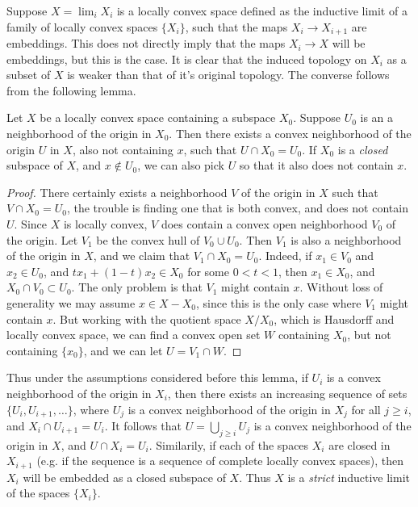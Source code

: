 Suppose $X = \lim_i X_i$ is a locally convex space defined as the inductive limit of a family of locally convex spaces $\{ X_i \}$, such that the maps $X_i \to X_{i+1}$ are embeddings. This does not directly imply that the maps $X_i \to X$ will be embeddings, but this is the case. It is clear that the induced topology on $X_i$ as a subset of $X$ is weaker than that of it's original topology. The converse follows from the following lemma.

\begin{lemma}
    Let $X$ be a locally convex space containing a subspace $X_0$. Suppose $U_0$ is an a neighborhood of the origin in $X_0$. Then there exists a convex neighborhood of the origin $U$ in $X$, also not containing $x$, such that $U \cap X_0 = U_0$. If $X_0$ is a \emph{closed} subspace of $X$, and $x \not \in U_0$, we can also pick $U$ so that it also does not contain $x$.
\end{lemma}
\begin{proof}
    There certainly exists a neighborhood $V$ of the origin in $X$ such that $V \cap X_0 = U_0$, the trouble is finding one that is both convex, and does not contain $U$. Since $X$ is locally convex, $V$ does contain a convex open neighborhood $V_0$ of the origin. Let $V_1$ be the convex hull of $V_0 \cup U_0$. Then $V_1$ is also a neighborhood of the origin in $X$, and we claim that $V_1 \cap X_0 = U_0$. Indeed, if $x_1 \in V_0$ and $x_2 \in U_0$, and $tx_1 + (1 - t)x_2 \in X_0$ for some $0 < t < 1$, then $x_1 \in X_0$, and $X_0 \cap V_0 \subset U_0$. The only problem is that $V_1$ might contain $x$. Without loss of generality we may assume $x \in X - X_0$, since this is the only case where $V_1$ might contain $x$. But working with the quotient space $X / X_0$, which is Hausdorff and locally convex space, we can find a convex open set $W$ containing $X_0$, but not containing $\{ x_0 \}$, and we can let $U = V_1 \cap W$.
\end{proof}

Thus under the assumptions considered before this lemma, if $U_i$ is a convex neighborhood of the origin in $X_i$, then there exists an increasing sequence of sets $\{ U_i, U_{i+1}, \dots \}$, where $U_j$ is a convex neighborhood of the origin in $X_j$ for all $j \geq i$, and $X_i \cap U_{i+1} = U_i$. It follows that $U = \bigcup_{j \geq i} U_j$ is a convex neighborhood of the origin in $X$, and $U \cap X_i = U_i$. Similarily, if each of the spaces $X_i$ are closed in $X_{i+1}$ (e.g. if the sequence is a sequence of complete locally convex spaces), then $X_i$ will be embedded as a closed subspace of $X$. Thus $X$ is a \emph{strict} inductive limit of the spaces $\{ X_i \}$.

